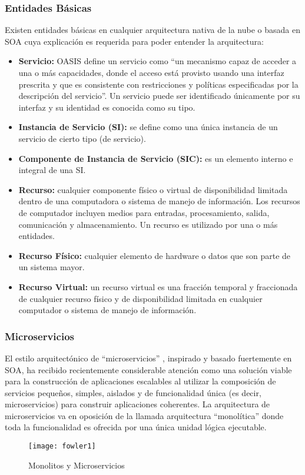         \subsubsection{Entidades Básicas}
        Existen entidades básicas en cualquier arquitectura nativa de la nube o basada en SOA cuya explicación es requerida para poder entender la arquitectura:
        \begin{itemize}
            \item \textbf{Servicio:} OASIS define un servicio como  “un mecanismo capaz de acceder a una o más capacidades, donde el acceso está provisto usando una interfaz prescrita y que es consistente con restricciones y políticas especificadas por la descripción del servicio”. Un servicio puede ser identificado únicamente por su interfaz y su identidad es conocida como su tipo. 
            \item \textbf{Instancia de Servicio (SI):} se define como una única instancia de un servicio de cierto tipo (de servicio).
            \item \textbf{Componente de Instancia de Servicio (SIC):} es un elemento interno e integral de una SI.
            \item \textbf{Recurso:} cualquier componente físico o virtual de disponibilidad limitada dentro de una computadora o sistema de manejo de información. Los recursos de computador incluyen medios para entradas, procesamiento, salida, comunicación y almacenamiento. Un recurso es utilizado por una o más entidades.
            \item \textbf{Recurso Físico:} cualquier elemento de hardware o datos que son parte de un sistema mayor.
            \item \textbf{Recurso Virtual: }un recurso virtual es una fracción temporal y fraccionada de cualquier recurso físico y de disponibilidad limitada en cualquier computador o sistema de manejo de información.
        \end{itemize}
     
        \subsubsection{Microservicios}
        El estilo arquitectónico de “microservicios” \cite{Lewis2016-az}, inspirado y basado fuertemente en SOA, ha recibido recientemente considerable atención como una solución viable para la construcción de aplicaciones escalables  al utilizar la composición de servicios pequeños, simples, aislados y de funcionalidad única (es decir, microservicios) para construir aplicaciones coherentes. La arquitectura de microservicios va en oposición de la llamada arquitectura “monolítica” donde toda la funcionalidad es ofrecida por una única unidad lógica ejecutable.
        \begin{figure}[ht]
            \centering
            \texttt{[image: fowler1]}
            \caption{Monolitos y Microservicios \protect\cite{Lewis2016-az}}
            \label{fig:fowler1}
        \end{figure}
    
